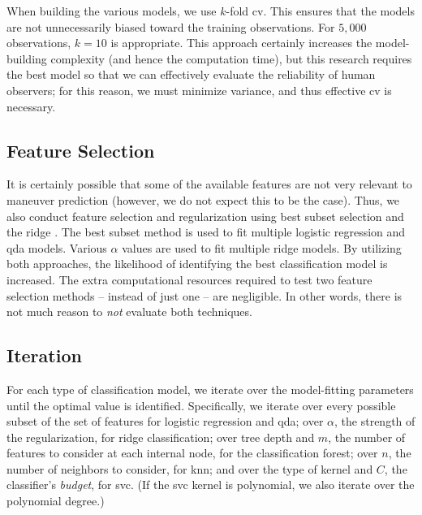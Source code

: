 \documentclass[../main.tex]{subfiles}
\begin{document}

When building the various models, we use $k$-fold \ac{cv}. This ensures that the models are not unnecessarily biased toward the training observations. For $5,000$ observations, $k=10$ is appropriate. This approach certainly increases the model-building complexity (and hence the computation time), but this research requires the best model so that we can effectively evaluate the reliability of human observers; for this reason, we must minimize variance, and thus effective \ac{cv} is necessary. 


\subsection{Feature Selection}

It is certainly possible that some of the available features are not very relevant to maneuver prediction (however, we do not expect this to be the case). Thus, we also conduct feature selection and regularization using best subset selection and the ridge \cite{James2013}. The best subset method is used to fit multiple logistic regression and \ac{qda} models. Various $\alpha$ values are used to fit multiple ridge models. By utilizing both approaches, the likelihood of identifying the best classification model is increased. The extra computational resources required to test two feature selection methods -- instead of just one -- are negligible. In other words, there is not much reason to \textit{not} evaluate both techniques.

\subsection{Iteration}

For each type of classification model, we iterate over the model-fitting parameters until the optimal value is identified. Specifically, we iterate over every possible subset of the set of features for logistic regression and \ac{qda}; over $\alpha$, the strength of the regularization, for ridge classification; over tree depth and $m$, the number of features to consider at each internal node, for the classification forest; over $n$, the number of neighbors to consider, for \ac{knn}; and over the type of kernel and $C$, the classifier's \textit{budget}, for \ac{svc}. (If the \ac{svc} kernel is polynomial, we also iterate over the polynomial degree.)
\end{document}
